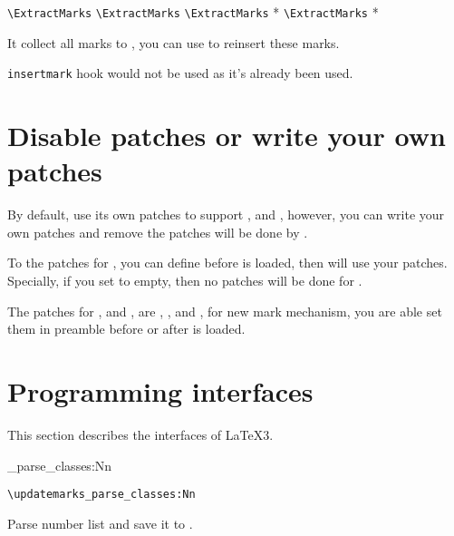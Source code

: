 \documentclass{l3doc}
\begin{document}
\begin{function}[added=2024-02-19]{\ExtractMarksTo}
  \begin{syntax}
    \verb|\ExtractMarks|  
    \verb|\ExtractMarks|   
    \verb|\ExtractMarks| *  
    \verb|\ExtractMarks| *   
  \end{syntax}
It collect all marks to , you can use  to reinsert these marks.

\texttt{insertmark} hook would not be used as it's already been used.
\end{function}

\section{Disable patches or write your own patches}

By default,  use its own patches to support ,
 and , however, you can write your own patches and 
remove the patches will be done by .

To the patches for , you can define 
before  is loaded, then  will use your patches.
Specially, if you set  to empty, then no patches will 
be done for .

The patches for ,  and , 
are , , 
 and \linebreak{},
 for new mark mechanism,
you are able set them in preamble before or after  is loaded.


\section{Programming interfaces}

This section describes the interfaces of \LaTeX3.

\begin{function}[added=2024-02-19]{\updatemarks_parse_classes:Nn}
  \begin{syntax}
    \verb|\updatemarks_parse_classes:Nn|  
  \end{syntax}
Parse number list and save it to .
\end{function}
\end{document}
